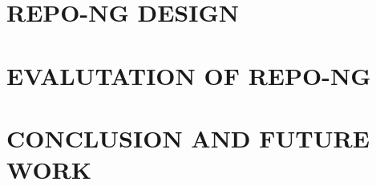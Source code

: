 \documentclass{acm_proc_article-sp}
\begin{document}
\section{REPO-NG DESIGN}

\section{EVALUTATION OF REPO-NG}

\section{CONCLUSION AND FUTURE WORK}



\end{document}
